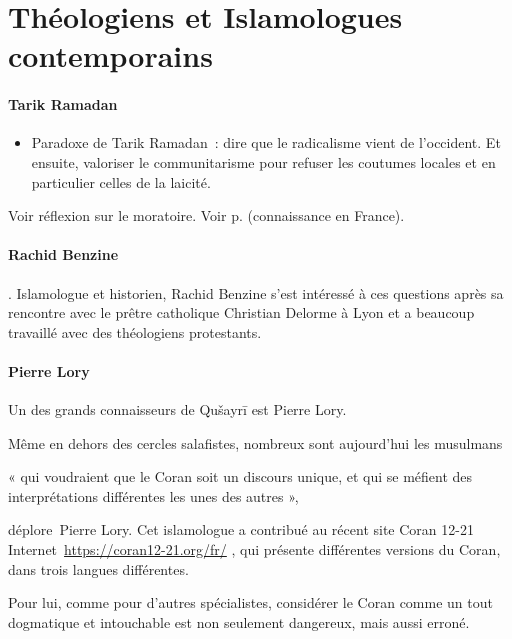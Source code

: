 \section{Théologiens et Islamologues contemporains}
\paragraph{Tarik Ramadan}
 \begin{itemize}
  \item Paradoxe de Tarik Ramadan~: dire que le radicalisme vient de
    l'occident. Et ensuite, valoriser le communitarisme pour refuser les
    coutumes locales et en particulier celles de la laicité.
  \end{itemize}
  
Voir réflexion sur le moratoire.
Voir p. \pageref{Theol:TRamadan1} (connaissance en France).


\paragraph{Rachid Benzine}. \label{Theo:Benzine}
Islamologue et historien, Rachid Benzine s’est intéressé à ces questions après sa rencontre avec le prêtre catholique Christian Delorme à Lyon et a beaucoup travaillé avec des théologiens protestants.
\paragraph{Pierre Lory}
\label{Theol:PierreLory}
Un des grands connaisseurs de Qušayrī est
Pierre Lory.

Même en dehors des cercles salafistes, nombreux sont aujourd'hui les
musulmans~

\begin{cite}
« qui voudraient que le Coran soit un discours unique,
et qui se méfient des interprétations différentes les unes des autres
»,~
\end{cite}
\emph{}déplore~{{Pierre
Lory}}. Cet islamologue a contribué au récent site {{Coran 12-21}}
Internet~\url{https://coran12-21.org/fr/} , qui
présente différentes versions du Coran, dans trois langues différentes.

Pour lui, comme pour d'autres spécialistes, considérer le Coran comme un
tout dogmatique et intouchable est non seulement dangereux, mais aussi
erroné.

